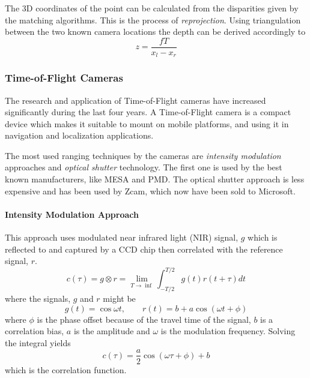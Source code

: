 The 3D coordinates of the point can be calculated from the disparities given by the
matching algorithms. This is the process of \emph{reprojection}. Using triangulation
between the two known camera locations the depth can be derived accordingly to 
\begin{equation}
    z = \frac{f T}{x_l - x_r}
\end{equation}

\subsubsection{Time-of-Flight Cameras}
The research and application of Time-of-Flight cameras have increased significantly during the last four
years. A Time-of-Flight camera is a compact device which makes it suitable to mount on
mobile platforms, and using it in navigation and localization applications. 

The most used ranging techniques by the cameras are \emph{intensity modulation} approaches and
\emph{optical shutter} technology. The first one is used by the best known manufacturers,
like MESA and PMD. The optical shutter approach is less expensive and has been used
by Zcam, which now have been sold to Microsoft. 


\paragraph{Intensity Modulation Approach}
\label{chap2:subsec-tof}
This approach uses modulated near infrared light (NIR) signal, $g$ which is reflected to and
captured by a CCD chip then correlated with the reference signal, $r$. 
\begin{equation}
    c(\tau) = g \otimes r = \lim_{T \rightarrow \inf} \int^{T/2}_{-T/2} g(t) r(t + \tau) dt
\end{equation}
where the signals, $g$ and $r$ might be
\begin{equation}
    g(t) = \cos{\omega t}, \quad \quad r(t) = b + a \cos{(\omega t + \phi)}
\end{equation}
where $\phi$ is the phase offset because of the travel time of the signal, $b$ is a
correlation bias, $a$ is the amplitude and $\omega$ is the modulation frequency. Solving
the integral yields 
\begin{equation}
    c(\tau) = \frac{a}{2} \cos{(\omega \tau + \phi )} + b
\end{equation}
which is the correlation function. 

